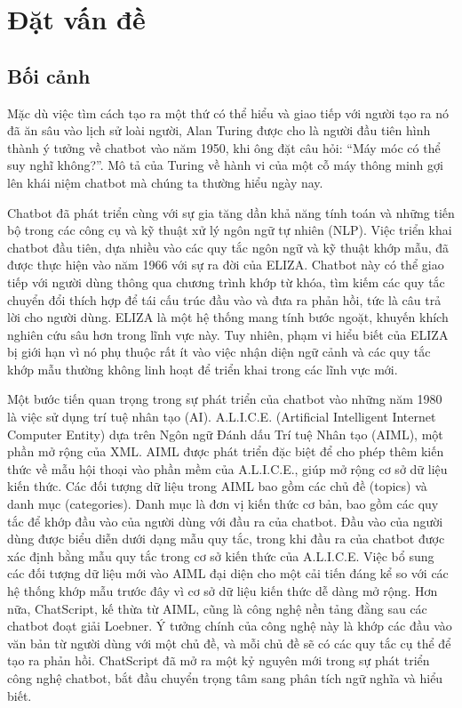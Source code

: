 \chapter{Đặt vấn đề}
\label{chapter:introduction}
\section{Bối cảnh}
\label{section:background}

Mặc dù việc tìm cách tạo ra một thứ có thể hiểu và giao tiếp với người tạo ra nó đã ăn sâu vào lịch sử loài người, Alan Turing được cho là người đầu tiên hình thành ý tưởng về chatbot vào năm 1950, khi ông đặt câu hỏi: “Máy móc có thể suy nghĩ không?”. Mô tả của Turing về hành vi của một cỗ máy thông minh gợi lên khái niệm chatbot mà chúng ta thường hiểu ngày nay.

Chatbot đã phát triển cùng với sự gia tăng dần khả năng tính toán và những tiến bộ trong các công cụ và kỹ thuật xử lý ngôn ngữ tự nhiên (NLP). Việc triển khai chatbot đầu tiên, dựa nhiều vào các quy tắc ngôn ngữ và kỹ thuật khớp mẫu, đã được thực hiện vào năm 1966 với sự ra đời của ELIZA. Chatbot này có thể giao tiếp với người dùng thông qua chương trình khớp từ khóa, tìm kiếm các quy tắc chuyển đổi thích hợp để tái cấu trúc đầu vào và đưa ra phản hồi, tức là câu trả lời cho người dùng. ELIZA là một hệ thống mang tính bước ngoặt, khuyến khích nghiên cứu sâu hơn trong lĩnh vực này. Tuy nhiên, phạm vi hiểu biết của ELIZA bị giới hạn vì nó phụ thuộc rất ít vào việc nhận diện ngữ cảnh và các quy tắc khớp mẫu thường không linh hoạt để triển khai trong các lĩnh vực mới.

Một bước tiến quan trọng trong sự phát triển của chatbot vào những năm 1980 là việc sử dụng trí tuệ nhân tạo (AI). A.L.I.C.E. (Artificial Intelligent Internet Computer Entity) dựa trên Ngôn ngữ Đánh dấu Trí tuệ Nhân tạo (AIML), một phần mở rộng của XML. AIML được phát triển đặc biệt để cho phép thêm kiến thức về mẫu hội thoại vào phần mềm của A.L.I.C.E., giúp mở rộng cơ sở dữ liệu kiến thức. Các đối tượng dữ liệu trong AIML bao gồm các chủ đề (topics) và danh mục (categories). Danh mục là đơn vị kiến thức cơ bản, bao gồm các quy tắc để khớp đầu vào của người dùng với đầu ra của chatbot. Đầu vào của người dùng được biểu diễn dưới dạng mẫu quy tắc, trong khi đầu ra của chatbot được xác định bằng mẫu quy tắc trong cơ sở kiến thức của A.L.I.C.E. Việc bổ sung các đối tượng dữ liệu mới vào AIML đại diện cho một cải tiến đáng kể so với các hệ thống khớp mẫu trước đây vì cơ sở dữ liệu kiến thức dễ dàng mở rộng. Hơn nữa, ChatScript, kế thừa từ AIML, cũng là công nghệ nền tảng đằng sau các chatbot đoạt giải Loebner. Ý tưởng chính của công nghệ này là khớp các đầu vào văn bản từ người dùng với một chủ đề, và mỗi chủ đề sẽ có các quy tắc cụ thể để tạo ra phản hồi. ChatScript đã mở ra một kỷ nguyên mới trong sự phát triển công nghệ chatbot, bắt đầu chuyển trọng tâm sang phân tích ngữ nghĩa và hiểu biết.

